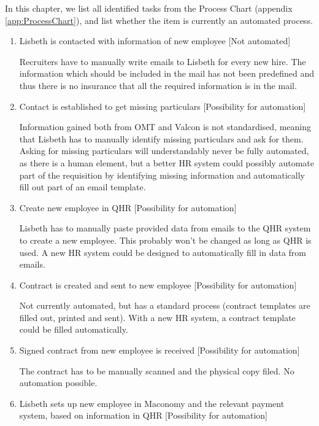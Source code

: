 \label{app:automatise}
In this chapter, we list all identified tasks from the Process Chart (appendix \ref*{app:ProcessChart}), and list whether the item is currently an automated process. 

\begin{enumerate}
	\item{Lisbeth is contacted with information of new employee} [Not automated]
	
		Recruiters have to manually write emails to Lisbeth for every new hire. The information which should be included in the mail has not been predefined and thus there is no insurance that all the required information is in the mail.
		
	\item{Contact is established to get missing particulars} [Possibility for automation]
	
		Information gained both from OMT and Valcon is not standardised, meaning that Lisbeth has to manually identify missing particulars and ask for them. Asking for missing particulars will understandably never be fully automated, as there is a human element, but a better HR system could possibly automate part of the requisition by identifying missing information and automatically fill out part of an email template.
		
	\item{Create new employee in QHR} [Possibility for automation]
	
		Lisbeth has to manually paste provided data from emails to the QHR system to create a new employee. This probably won't be changed as long as QHR is used. A new HR system could be designed to automatically fill in data from emails.
	
	\item{Contract is created and sent to new employee} [Possibility for automation]
	
		Not currently automated, but has a standard process (contract templates are filled out, printed and sent).
		With a new HR system, a contract template could be filled automatically.
	
	\item{Signed contract from new employee is received} [Possibility for automation]
	
		The contract has to be manually scanned and the physical copy filed. No automation possible.
	
	\item{Lisbeth sets up new employee in Maconomy and the relevant payment system, based on information in QHR} [Possibility for automation]
	

\end{enumerate}
